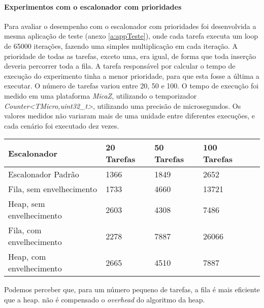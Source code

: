 \paragraph{Experimentos com o escalonador com prioridades}
Para avaliar o desempenho com o escalonador com prioridades foi desenvolvida a mesma aplicação de teste (anexo
\ref{a:appTeste}),
onde cada tarefa executa um loop de 65000 iterações, fazendo uma simples multiplicação em cada iteração. 
A prioridade de todas as tarefas, exceto uma, era igual, de forma que toda inserção deveria percorrer toda a fila.
A tarefa responsável por calcular o tempo de execução do experimento tinha a menor prioridade, para que esta fosse a
última a executar.
O número de tarefas variou entre 20, 50 e 100.
O tempo de execução foi medido em uma plataforma \textit{MicaZ}, utilizando o temporizador 
\textit{Counter<TMicro,uint32\_t>}, utilizando uma precisão de microsegundos. 
Os valores medidos não variaram mais de uma unidade entre diferentes execuções, e cada cenário foi executado dez
vezes.
\begin{center}
    \begin{tabular}{ | l | l | l | l | p{5cm} |}
    \hline
    Escalonador              & 20 Tarefas & 50 Tarefas & 100 Tarefas \\ \hline
    Escalonador Padrão       & 1366 & 1849 & 2652 \\ \hline 
    Fila, sem envelhecimento & 1733 & 4660 & 13721 \\ \hline 
    Heap, sem envelhecimento & 2603 & 4308 & 7486 \\ \hline
    Fila, com envelhecimento & 2278 & 7887 & 26066 \\ \hline
    Heap, com envelhecimento & 2665 & 4510 & 7887 \\ \hline
    \end{tabular}
\end{center}

Podemos perceber que, para um número pequeno de tarefas, a fila é mais eficiente que a heap.
não é compensado o \textit{overhead} do algoritmo da heap.

